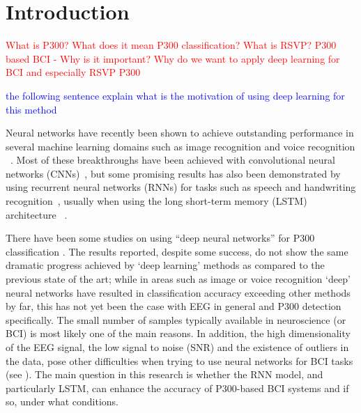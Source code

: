 \documentclass[
12pt, %
english, %
doublespacing, %
headsepline, %
]{MastersDoctoralThesis} %
\begin{document}

\chapter{Introduction}

\vspace{0.4cm}






\textcolor{red}{What is P300? What does it mean P300 classification? What is RSVP?}
\textcolor{red}{P300 based BCI - Why is it important?}
\textcolor{red}{Why do we want to apply deep learning for BCI and especially RSVP P300}

\textcolor{blue}{the following sentence explain what is the motivation of using deep learning for this method}

Neural networks have recently been shown to achieve outstanding performance in several machine learning domains such as image recognition \cite{krizhevsky2012imagenet} and voice recognition ~\cite{hinton2012deep}. Most of these breakthroughs have been achieved with convolutional neural networks (CNNs)~\cite{Lenet98}, but some promising results has also been demonstrated by using recurrent neural networks (RNNs) for tasks such as speech and handwriting recognition~\cite{graves2013speech, graves2008unconstrained}, usually when using the long short-term memory (LSTM) architecture ~\cite{LSTM_origin}.

There have been some studies on using ``deep neural networks'' for P300 classification \cite{P300_CNN, RSVP_P300_geva}. The results reported, despite some success, do not show the same dramatic progress achieved by `deep learning' methods as compared to the previous state of the art; while in areas such as image or voice recognition `deep' neural networks have resulted in classification accuracy exceeding other methods by far, this has not yet been the case with EEG in general and P300 detection specifically. The small number of samples typically available in neuroscience (or BCI) is most likely one of the main reasons. In addition, the high dimensionality of the EEG signal, the low signal to noise (SNR) and the existence of outliers in the data, pose other difficulties when trying to use neural networks for BCI tasks (see \cite{lotte2007review}). The main question in this research is whether the RNN model, and particularly LSTM, can enhance the accuracy of P300-based BCI systems and if so, under what conditions.
\end{document}
